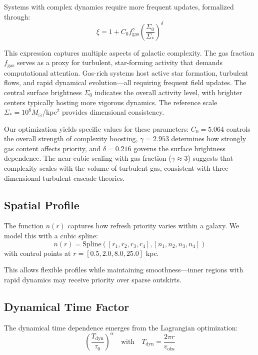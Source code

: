 \documentclass[twocolumn,prd,amsmath,amssymb,aps,superscriptaddress,nofootinbib]{revtex4-2}
\begin{document}
Systems with complex dynamics require more frequent updates, formalized through:
\begin{equation}
\xi = 1 + C_0 f_{\text{gas}}^\gamma \left(\frac{\Sigma_0}{\Sigma_*}\right)^\delta
\end{equation}

This expression captures multiple aspects of galactic complexity. The gas fraction $f_{\text{gas}}$ serves as a proxy for turbulent, star-forming activity that demands computational attention. Gas-rich systems host active star formation, turbulent flows, and rapid dynamical evolution---all requiring frequent field updates. The central surface brightness $\Sigma_0$ indicates the overall activity level, with brighter centers typically hosting more vigorous dynamics. The reference scale $\Sigma_* = 10^8 M_\odot$/kpc$^2$ provides dimensional consistency.

Our optimization yields specific values for these parameters: $C_0 = 5.064$ controls the overall strength of complexity boosting, $\gamma = 2.953$ determines how strongly gas content affects priority, and $\delta = 0.216$ governs the surface brightness dependence. The near-cubic scaling with gas fraction ($\gamma \approx 3$) suggests that complexity scales with the volume of turbulent gas, consistent with three-dimensional turbulent cascade theories.

\subsection{Spatial Profile}

The function $n(r)$ captures how refresh priority varies within a galaxy. We model this with a cubic spline:
\begin{equation}
n(r) = \text{Spline}([r_1, r_2, r_3, r_4], [n_1, n_2, n_3, n_4])
\end{equation}
with control points at $r = [0.5, 2.0, 8.0, 25.0]$ kpc.

This allows flexible profiles while maintaining smoothness---inner regions with rapid dynamics may receive priority over sparse outskirts.

\subsection{Dynamical Time Factor}

The dynamical time dependence emerges from the Lagrangian optimization:
\begin{equation}
\left(\frac{T_{\text{dyn}}}{\tau_0}\right)^\alpha \quad \text{with} \quad T_{\text{dyn}} = \frac{2\pi r}{v_{\text{obs}}}
\end{equation}
\end{document}
